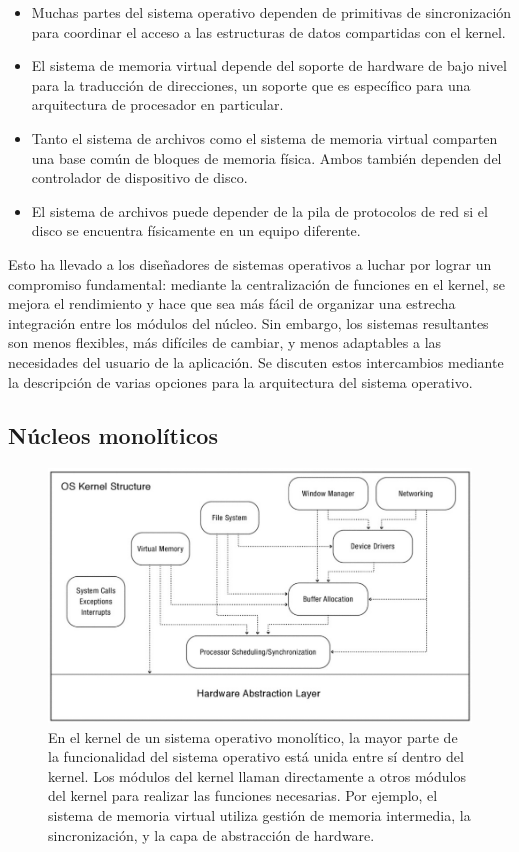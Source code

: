 \documentclass[10pt]{book}
\begin{document}
\begin{itemize}
\item Muchas partes del sistema operativo dependen de primitivas de sincronización para coordinar el acceso a las estructuras de datos compartidas con el kernel.
\item El sistema de memoria virtual depende del soporte de hardware de bajo nivel para la traducción de direcciones, un soporte que es específico para una arquitectura de procesador en particular.
\item Tanto el sistema de archivos como el sistema de memoria virtual comparten una base común de bloques de memoria física. Ambos también dependen del controlador de dispositivo de disco.
\item El sistema de archivos puede depender de la pila de protocolos de red si el disco se encuentra físicamente en un equipo diferente.
\end{itemize}

Esto ha llevado a los diseñadores de sistemas operativos a luchar por lograr un compromiso fundamental: mediante la centralización de funciones en el kernel, se mejora el rendimiento y hace que sea más fácil de organizar una estrecha integración entre los módulos del núcleo. Sin embargo, los sistemas resultantes son menos flexibles, más difíciles de cambiar, y menos adaptables a las necesidades del usuario de la aplicación. Se discuten estos intercambios mediante la descripción de varias opciones para la arquitectura del sistema operativo.

\subsection{Núcleos monolíticos}
\begin{figure}[tbhp]
\centerline{\includegraphics[scale=0.55]{img/fig0303}}
\caption{En el kernel de un sistema operativo monolítico, la mayor parte de la funcionalidad del sistema operativo está unida entre sí dentro del kernel. Los módulos del kernel llaman directamente a otros módulos del kernel para realizar las funciones necesarias. Por ejemplo, el sistema de memoria virtual utiliza gestión de memoria intermedia, la sincronización, y la capa de abstracción de hardware.}
\label{fig0303}
\end{figure}
\end{document}
